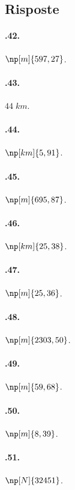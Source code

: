 \subsection{Risposte}
\begin{multicols}{3}
 \paragraph{\thechapter.42.}$\np[m]{597,27}$.

\paragraph{\thechapter.43.}$44\;\unit{km}$.

\paragraph{\thechapter.44.}$\np[km]{5,91}$.

\paragraph{\thechapter.45.}$\np[m]{695,87}$.

\paragraph{\thechapter.46.}$\np[km]{25,38}$.

\paragraph{\thechapter.47.}$\np[m]{25,36}$.

\paragraph{\thechapter.48.}$\np[m]{2303,50}$.

\paragraph{\thechapter.49.}${\np[m]{59,68}}$.

\paragraph{\thechapter.50.}$\np[m]{8,39}$.

\paragraph{\thechapter.51.}$\np[N]{32451}$.


\end{multicols}
